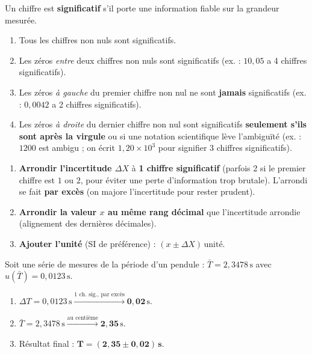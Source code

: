 \documentclass[11pt]{article}
\begin{document}
\begin{propriete}
Un chiffre est \textbf{significatif} s'il porte une information fiable sur la grandeur mesurée.
\begin{enumerate}
    \item Tous les chiffres non nuls sont significatifs.
    \item Les zéros \emph{entre} deux chiffres non nuls sont significatifs (ex. : $10,05$ a 4 chiffres significatifs).
    \item Les zéros \emph{à gauche} du premier chiffre non nul ne sont \textbf{jamais} significatifs (ex. : $0,0042$ a 2 chiffres significatifs).
    \item Les zéros \emph{à droite} du dernier chiffre non nul sont significatifs \textbf{seulement s'ils sont après la virgule} ou si une notation scientifique lève l'ambiguïté (ex. : $1200$ est ambigu ; on écrit $1,20\times10^3$ pour signifier 3 chiffres significatifs).
\end{enumerate}
\end{propriete}

\begin{methode}
\begin{enumerate}
    \item \textbf{Arrondir l'incertitude $\Delta X$} à \textbf{1 chiffre significatif} (parfois 2 si le premier chiffre est $1$ ou $2$, pour éviter une perte d'information trop brutale). L'arrondi se fait \textbf{par excès} (on majore l'incertitude pour rester prudent).
    \item \textbf{Arrondir la valeur $x$ au même rang décimal} que l'incertitude arrondie (alignement des dernières décimales).
    \item \textbf{Ajouter l'unité} (SI de préférence) : $(x \pm \Delta X)\,\text{unité}$.
\end{enumerate}
\end{methode}

\begin{exemplebox}
Soit une série de mesures de la période d'un pendule : $\bar{T} = 2,3478\,\text{s}$ avec $u(\bar{T}) = 0,0123\,\text{s}$.
\begin{enumerate}
    \item $\Delta T = 0,0123\,\text{s} \xrightarrow{\text{1 ch. sig., par excès}} \mathbf{0,02}\,\text{s}$.
    \item $\bar{T} = 2,3478\,\text{s} \xrightarrow{\text{au centième}} \mathbf{2,35}\,\text{s}$.
    \item Résultat final : $\mathbf{T = (2,35 \pm 0,02)\,\text{s}}$.
\end{enumerate}
\end{exemplebox}
\end{document}
